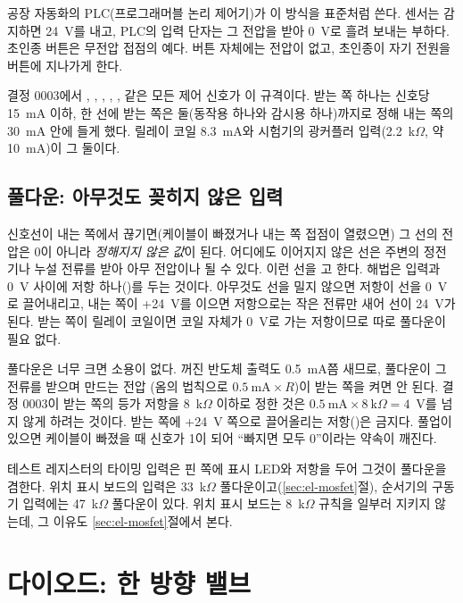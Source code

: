\General 공장 자동화의 PLC(프로그래머블 논리 제어기)가 이 방식을 표준처럼 쓴다. 센서는 감지하면 24~V를 내고, PLC의
입력 단자는 그 전압을 받아 0~V로 흘려 보내는 부하다. 초인종 버튼은 무전압 접점의 예다. 버튼 자체에는 전압이
없고, 초인종이 자기 전원을 버튼에 지나가게 한다.

\Ours 결정 0003에서 , , , , ,  같은 모든 제어
신호가 이 규격이다. 받는 쪽 하나는 신호당 15~mA 이하, 한 선에 받는 쪽은 둘(동작용 하나와 감시용 하나)까지로
정해 내는 쪽의 30~mA 안에 들게 했다. 릴레이 코일 8.3~mA와 시험기의 광커플러 입력(2.2~k$\Omega$, 약 10~mA)이
그 둘이다.

\subsection{풀다운: 아무것도 꽂히지 않은 입력}\label{sec:el-pulldown}

\Why 신호선이 내는 쪽에서 끊기면(케이블이 빠졌거나 내는 쪽 접점이 열렸으면) 그 선의 전압은 0이 아니라 \emph{정해지지
않은 값}이 된다. 어디에도 이어지지 않은 선은 주변의 정전기나 누설 전류를 받아 아무 전압이나 될 수 있다. 이런 선을
고 한다. 해법은 입력과 0~V 사이에 저항 하나()를 두는 것이다. 아무것도
선을 밀지 않으면 저항이 선을 0~V로 끌어내리고, 내는 쪽이 +24~V를 이으면 저항으로는 작은 전류만 새어 선이 24~V가
된다. 받는 쪽이 릴레이 코일이면 코일 자체가 0~V로 가는 저항이므로 따로 풀다운이 필요 없다.

풀다운은 너무 크면 소용이 없다. 꺼진 반도체 출력도 0.5~mA쯤 새므로, 풀다운이 그 전류를 받으며 만드는 전압
(옴의 법칙으로 $0.5\ \text{mA} \times R$)이 받는 쪽을 켜면 안 된다. 결정 0003이 받는 쪽의 등가 저항을 8~k$\Omega$
이하로 정한 것은 $0.5\ \text{mA} \times 8\ \text{k}\Omega = 4$~V를 넘지 않게 하려는 것이다. 받는 쪽에 +24~V 쪽으로
끌어올리는 저항()은 금지다. 풀업이 있으면 케이블이 빠졌을 때 신호가 1이 되어 ``빠지면 모두
0''이라는 약속이 깨진다.

\Ours 테스트 레지스터의 타이밍 입력은 핀 쪽에 표시 LED와 저항을 두어 그것이 풀다운을 겸한다. 위치 표시 보드의
 입력은 33~k$\Omega$ 풀다운이고(\ref{sec:el-mosfet}절), 순서기의 구동기 입력에는 47~k$\Omega$ 풀다운이
있다. 위치 표시 보드는 8~k$\Omega$ 규칙을 일부러 지키지 않는데, 그 이유도 \ref{sec:el-mosfet}절에서 본다.

\section{다이오드: 한 방향 밸브}\label{sec:el-diode}

